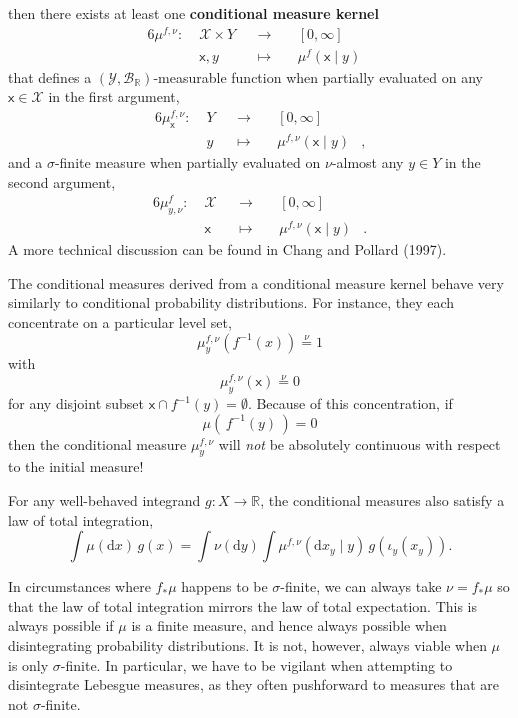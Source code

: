 \documentclass[
  letterpaper,
  DIV=11,
  numbers=noendperiod]{scrartcl}
\begin{document}
then there exists at least one \textbf{conditional measure kernel}
\begin{alignat*}{6}
\mu^{f, \nu} :\; &\mathcal{X} \times Y& &\rightarrow& \; &[0, \infty]&
\\
&\mathsf{x}, y& &\mapsto& &\mu^{f}( \mathsf{x} \mid y )&
\end{alignat*} that defines a
\((\mathcal{Y}, \mathcal{B}_{\mathbb{R}})\)-measurable function when
partially evaluated on any \(\mathsf{x} \in \mathcal{X}\) in the first
argument, \begin{alignat*}{6}
\mu^{f, \nu}_{\mathsf{x}} :\; &Y& &\rightarrow& \; &[0, \infty]&
\\
&y& &\mapsto& &\mu^{f, \nu}( \mathsf{x} \mid y )&,
\end{alignat*} and a \(\sigma\)-finite measure when partially evaluated
on \(\nu\)-almost any \(y \in Y\) in the second argument,
\begin{alignat*}{6}
\mu^{f}_{y, \nu} :\; &\mathcal{X}& &\rightarrow& \; &[0, \infty]&
\\
&\mathsf{x}& &\mapsto& &\mu^{f, \nu}( \mathsf{x} \mid y )&.
\end{alignat*} A more technical discussion can be found in Chang and
Pollard (1997).

The conditional measures derived from a conditional measure kernel
behave very similarly to conditional probability distributions. For
instance, they each concentrate on a particular level set, \[
\mu^{f, \nu}_{y}( f^{-1}(x) ) \overset{\nu}{=} 1
\] with \[
\mu^{f, \nu}_{y}( \mathsf{x} ) \overset{\nu}{=} 0
\] for any disjoint subset \(\mathsf{x} \cap f^{-1}(y) = \emptyset\).
Because of this concentration, if \[
\mu( \, f^{-1}(y) \, ) = 0
\] then the conditional measure \(\mu^{f, \nu}_{y}\) will \emph{not} be
absolutely continuous with respect to the initial measure!

For any well-behaved integrand \(g : X \rightarrow \mathbb{R}\), the
conditional measures also satisfy a law of total integration, \[
\int \mu( \mathrm{d} x ) \, g(x)
=
\int \nu (\mathrm{d} y)
\int \mu^{f, \nu}( \mathrm{d}x_{y} \mid y ) \,
g( \iota_{y}(x_{y})).
\]

In circumstances where \(f_{*} \mu\) happens to be \(\sigma\)-finite, we
can always take \(\nu = f_{*} \mu\) so that the law of total integration
mirrors the law of total expectation. This is always possible if \(\mu\)
is a finite measure, and hence always possible when disintegrating
probability distributions. It is not, however, always viable when
\(\mu\) is only \(\sigma\)-finite. In particular, we have to be vigilant
when attempting to disintegrate Lebesgue measures, as they often
pushforward to measures that are not \(\sigma\)-finite.
\end{document}
